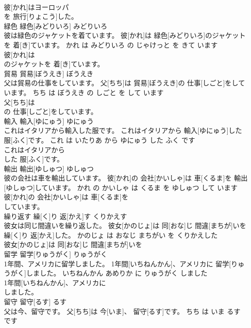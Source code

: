 \documentclass[8pt]{extreport}
\begin{document}
\begin{CJK}{UTF8}{min}
\\	彼[かれ]はヨーロッパ
\\	を 旅行[りょこう]した。			
\\	緑色	緑色[みどりいろ]	みどりいろ	
\\	彼は緑色のジャケットを着ています。	彼[かれ]は 緑色[みどりいろ]のジャケットを 着[き]ています。	かれ は みどりいろ の じゃけっと を きて います	
\\	彼[かれ]は
\\	のジャケットを 着[き]ています。			
\\	貿易	貿易[ぼうえき]	ぼうえき	
\\	父は貿易の仕事をしています。	父[ちち]は 貿易[ぼうえき]の 仕事[しごと]をしています。	ちち は ぼうえき の しごと を して います	
\\	父[ちち]は
\\	の 仕事[しごと]をしています。			
\\	輸入	輸入[ゆにゅう]	ゆにゅう	
\\	これはイタリアから輸入した服です。	これはイタリアから 輸入[ゆにゅう]した 服[ふく]です。	これ は いたりあ から ゆにゅう した ふく です	
\\	これはイタリアから
\\	した 服[ふく]です。			
\\	輸出	輸出[ゆしゅつ]	ゆしゅつ	
\\	彼の会社は車を輸出しています。	彼[かれ]の 会社[かいしゃ]は 車[くるま]を 輸出[ゆしゅつ]しています。	かれ の かいしゃ は くるま を ゆしゅつ して います	
\\	彼[かれ]の 会社[かいしゃ]は 車[くるま]を
\\	しています。			
\\	繰り返す	繰[く]り 返[かえ]す	くりかえす	
\\	彼女は同じ間違いを繰り返した。	彼女[かのじょ]は 同[おな]じ 間違[まちが]いを 繰[く]り 返[かえ]した。	かのじょ は おなじ まちがい を くりかえした	
\\	彼女[かのじょ]は 同[おな]じ 間違[まちが]いを
\\	留学	留学[りゅうがく]	りゅうがく	
\\	1年間、アメリカに留学しました。	1年間[いちねんかん]、アメリカに 留学[りゅうがく]しました。	いちねんかん あめりか に りゅうがく しました	
\\	1年間[いちねんかん]、アメリカに
\\	しました。			
\\	留守	留守[るす]	るす	
\\	父は今、留守です。	父[ちち]は 今[いま]、 留守[るす]です。	ちち は いま るす です	

\end{CJK}
\end{document}
